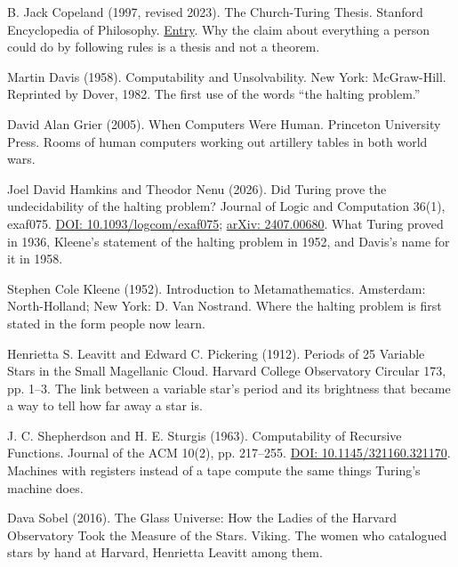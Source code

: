 \noindent B. Jack Copeland (1997, revised 2023). The Church-Turing Thesis. Stanford Encyclopedia of Philosophy. \href{https://plato.stanford.edu/entries/church-turing/}{Entry}. Why the claim about everything a person could do by following rules is a thesis and not a theorem.
\par\medskip

\noindent Martin Davis (1958). Computability and Unsolvability. New York: McGraw-Hill. Reprinted by Dover, 1982. The first use of the words ``the halting problem.''
\par\medskip

\noindent David Alan Grier (2005). When Computers Were Human. Princeton University Press. Rooms of human computers working out artillery tables in both world wars.
\par\medskip

\noindent Joel David Hamkins and Theodor Nenu (2026). Did Turing prove the undecidability of the halting problem? Journal of Logic and Computation 36(1), exaf075. \href{https://doi.org/10.1093/logcom/exaf075}{DOI: 10.1093/logcom/exaf075}; \href{https://arxiv.org/abs/2407.00680}{arXiv: 2407.00680}. What Turing proved in 1936, Kleene's statement of the halting problem in 1952, and Davis's name for it in 1958.
\par\medskip

\noindent Stephen Cole Kleene (1952). Introduction to Metamathematics. Amsterdam: North-Holland; New York: D. Van Nostrand. Where the halting problem is first stated in the form people now learn.
\par\medskip

\noindent Henrietta S. Leavitt and Edward C. Pickering (1912). Periods of 25 Variable Stars in the Small Magellanic Cloud. Harvard College Observatory Circular 173, pp. 1--3. The link between a variable star's period and its brightness that became a way to tell how far away a star is.
\par\medskip

\noindent J. C. Shepherdson and H. E. Sturgis (1963). Computability of Recursive Functions. Journal of the ACM 10(2), pp. 217--255. \href{https://doi.org/10.1145/321160.321170}{DOI: 10.1145/321160.321170}. Machines with registers instead of a tape compute the same things Turing's machine does.
\par\medskip

\noindent Dava Sobel (2016). The Glass Universe: How the Ladies of the Harvard Observatory Took the Measure of the Stars. Viking. The women who catalogued stars by hand at Harvard, Henrietta Leavitt among them.
\par\medskip

